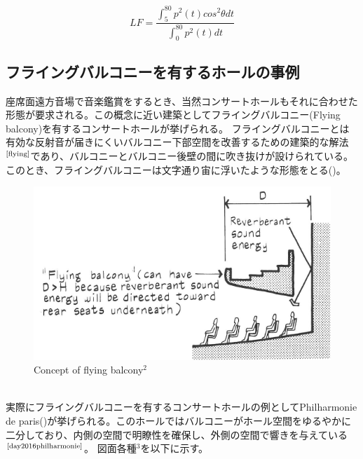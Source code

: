 \begin{equation}
    \label{eq:lf}
  LF = \frac{\displaystyle\int_5^{80}p^2(t)cos^2{\theta}dt}{\displaystyle\int_0^{80}p^2(t)dt} 
\end{equation}


\pagebreak
\subsection{フライングバルコニーを有するホールの事例}
座席面遠方音場で音楽鑑賞をするとき、当然コンサートホールもそれに合わせた形態が要求される。この概念に近い建築としてフライングバルコニー(Flying balcony)を有するコンサートホールが挙げられる。
フライングバルコニーとは有効な反射音が届きにくいバルコニー下部空間を改善するための建築的な解法$^{\text{\cite{flying}}}$であり、バルコニーとバルコニー後壁の間に吹き抜けが設けられている。このとき、フライングバルコニーは文字通り宙に浮いたような形態をとる()。
\begin{figure}[htbp]
    \centering
    \includegraphics[keepaspectratio,scale=1]{01_att/flyingbalcony.pdf}
    \caption{\hspace{1mm}Concept of flying balcony$^2$}
    \label{fig:flyigbalcony}
\end{figure}
\\ 実際にフライングバルコニーを有するコンサートホールの例としてPhilharmonie de paris()が挙げられる。このホールではバルコニーがホール空間をゆるやかに二分しており、内側の空間で明瞭性を確保し、外側の空間で響きを与えている$^{\text{\cite{day2016philharmonie}}}$。
図面各種$^3$を以下に示す。
